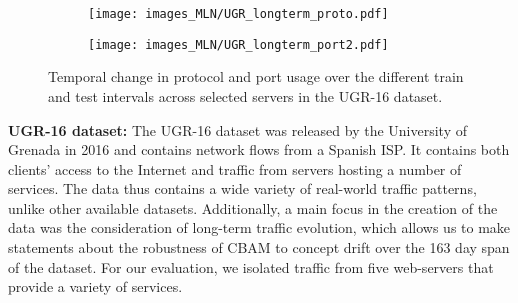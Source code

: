 \begin{figure}[ht]
\centering
\vspace{-0.2cm}
    \begin{subfigure}[b]{0.45\textwidth}
        \texttt{[image: images\_MLN/UGR\_longterm\_proto.pdf]}
        \vspace{-0.15cm}
    \end{subfigure}
    \begin{subfigure}[b]{0.45\textwidth}
        \texttt{[image: images\_MLN/UGR\_longterm\_port2.pdf]}
    \end{subfigure}
\caption{Temporal change in protocol and port usage over the different train and test intervals across selected servers in the UGR-16 dataset.}
\label{fig:longterm_analysis}
\end{figure}

\textbf{UGR-16 dataset:}
The UGR-16 dataset \cite{macia2018ugr} was released by the University of Grenada in 2016 and contains network flows from a Spanish ISP. It contains both clients' access to the Internet and traffic from servers hosting a number of services. The data thus contains a wide variety of real-world traffic patterns, unlike other available datasets. %
Additionally, a main focus in the creation of the data was the consideration of long-term traffic evolution, which allows us to make statements about the robustness of CBAM to concept drift over the 163 day span of the dataset. For our evaluation, we isolated traffic from five web-servers that provide a variety of services.


